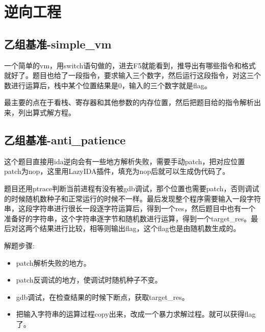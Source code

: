 \chapter{逆向工程}
\section{乙组基准-simple\_vm}
一个简单的vm，用switch语句做的，进去F5就能看到，推导出有哪些指令和格式就好了。题目也给了一段指令，要求输入三个数字，然后运行这段指令，对这三个数进行运算后，栈中某个位置结果是0，输入的三个数字就是flag。

最主要的点在于看栈、寄存器和其他参数的内存位置，然后把题目给的指令解析出来，列出算式解方程。

\section{乙组基准-anti\_patience}
这个题目直接用ida逆向会有一些地方解析失败，需要手动patch，把对应位置patch为nop，这里用LazyIDA插件，填充为nop后就可以生成伪代码了。

题目还用ptrace判断当前进程有没有被gdb调试，那个位置也需要patch，否则调试的时候随机数种子和正常运行的时候不一样。最后发现整个程序需要输入一段字符串，这段字符串进行很长一段逐字符运算后，得到一个res，然后题目中也有一个准备好的字符串，这个字符串逐字节和随机数进行运算，得到一个target\_res。最后对这两个结果进行比较，相等则输出flag，这个flag也是由随机数生成的。

解题步骤:
\begin{itemize}
    \item patch解析失败的地方。
    \item patch反调试的地方，使调试时随机种子不变。
    \item gdb调试，在检查结果的时候下断点，获取target\_res。
    \item 把输入字符串的运算过程copy出来，改成一个暴力求解过程。就可以获得flag了。
\end{itemize}